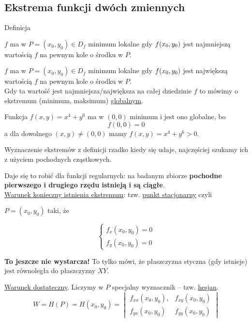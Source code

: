 \subsection{Ekstrema funkcji dwóch zmiennych}

\begin{tw}{Definicja}

$f$ ma w $ P = (x_0, y_0) \in D_f $ minimum lokalne gdy $ f(x_0, y_0) $ jest najmniejszą wartością $f$ na pewnym kole o środku w $P$.

$f$ ma w $ P = (x_0, y_0) \in D_f $ minimum lokalne gdy $ f(x_0, y_0) $ jest największą wartością $f$ na pewnym kole o środku w $P$. \\

Gdy ta wartość jest najmniejsza/największa na całej dziedzinie $f$ to mówimy o ekstremum (minimum, maksimum) \underline{globalnym}.
\end{tw}

\begin{przyklad}
Funkcja $ f(x,y) = x^4 + y^6 $ ma w $(0,0)$ minimum i jest ono globalne, bo
$$ f(0,0) = 0 $$
a dla dowolnego $ (x,y) \neq (0,0) $ mamy $ f(x,y) = x^4 + y^6 > 0 $.
\end{przyklad}

Wyznaczenie ekstremów z definicji rzadko kiedy się udaje, najczęściej szukamy ich z użyciem pochodnych cząstkowych.

Daje się to robić dla funkcji regularnych: na badanym zbiorze \textbf{pochodne pierwszego i drugiego rzędu istnieją i są ciągłe}. \\

\underline{Warunek konieczny istnienia ekstremum}: tzw. \underline{punkt stacjonarny} czyli

$ P = (x_0, y_0) $ taki, że 

$$ \left\{ \begin{aligned} f_x(x_0, y_0) = 0 \\ f_y(x_0, y_0) = 0  \end{aligned} \right. $$

\textbf{To jeszcze nie wystarcza!} To tylko mówi, że płaszczyzna styczna (gdy istnieje) jest równoległa do płaszczyzny $XY$.

\underline{Warunek dostateczny}. Liczymy w $P$ specjalny wyznacznik -- tzw. \underline{hesjan}.
$$ W = H(P) = H(x_0, y_0) = \begin{vmatrix} f_{xx}(x_0, y_0), & f_{xy}(x_0, y_0) \\ f_{yx}(x_0, y_0) & f_{yy}(x_0, y_0) \end{vmatrix} $$

